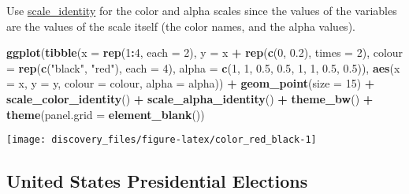 \documentclass[]{book}
\newenvironment{Shaded}{\begin{snugshade}}{\end{snugshade}}
\newcommand{\KeywordTok}[1]{\textcolor[rgb]{0.13,0.29,0.53}{\textbf{#1}}}
\newcommand{\DataTypeTok}[1]{\textcolor[rgb]{0.13,0.29,0.53}{#1}}
\newcommand{\DecValTok}[1]{\textcolor[rgb]{0.00,0.00,0.81}{#1}}
\newcommand{\FloatTok}[1]{\textcolor[rgb]{0.00,0.00,0.81}{#1}}
\newcommand{\StringTok}[1]{\textcolor[rgb]{0.31,0.60,0.02}{#1}}
\newcommand{\OperatorTok}[1]{\textcolor[rgb]{0.81,0.36,0.00}{\textbf{#1}}}
\newcommand{\NormalTok}[1]{#1}
\theoremstyle{definition}
\theoremstyle{definition}
\theoremstyle{definition}
\theoremstyle{remark}
\begin{document}
Use
\href{http://docs.ggplot2.org/current/scale_identity.html}{scale\_identity}
for the color and alpha scales since the values of the variables are the
values of the scale itself (the color names, and the alpha values).

\begin{Shaded}
\begin{Highlighting}[]
\KeywordTok{ggplot}\NormalTok{(}\KeywordTok{tibble}\NormalTok{(}\DataTypeTok{x =} \KeywordTok{rep}\NormalTok{(}\DecValTok{1}\OperatorTok{:}\DecValTok{4}\NormalTok{, }\DataTypeTok{each =} \DecValTok{2}\NormalTok{),}
              \DataTypeTok{y =}\NormalTok{ x }\OperatorTok{+}\StringTok{ }\KeywordTok{rep}\NormalTok{(}\KeywordTok{c}\NormalTok{(}\DecValTok{0}\NormalTok{, }\FloatTok{0.2}\NormalTok{), }\DataTypeTok{times =} \DecValTok{2}\NormalTok{),}
              \DataTypeTok{colour =} \KeywordTok{rep}\NormalTok{(}\KeywordTok{c}\NormalTok{(}\StringTok{"black"}\NormalTok{, }\StringTok{"red"}\NormalTok{), }\DataTypeTok{each =} \DecValTok{4}\NormalTok{),}
              \DataTypeTok{alpha =} \KeywordTok{c}\NormalTok{(}\DecValTok{1}\NormalTok{, }\DecValTok{1}\NormalTok{, }\FloatTok{0.5}\NormalTok{, }\FloatTok{0.5}\NormalTok{, }\DecValTok{1}\NormalTok{, }\DecValTok{1}\NormalTok{, }\FloatTok{0.5}\NormalTok{, }\FloatTok{0.5}\NormalTok{)),}
  \KeywordTok{aes}\NormalTok{(}\DataTypeTok{x =}\NormalTok{ x, }\DataTypeTok{y =}\NormalTok{ y, }\DataTypeTok{colour =}\NormalTok{ colour, }\DataTypeTok{alpha =}\NormalTok{ alpha)) }\OperatorTok{+}
\StringTok{  }\KeywordTok{geom_point}\NormalTok{(}\DataTypeTok{size =} \DecValTok{15}\NormalTok{) }\OperatorTok{+}
\StringTok{  }\KeywordTok{scale_color_identity}\NormalTok{() }\OperatorTok{+}
\StringTok{  }\KeywordTok{scale_alpha_identity}\NormalTok{() }\OperatorTok{+}
\StringTok{  }\KeywordTok{theme_bw}\NormalTok{() }\OperatorTok{+}
\StringTok{  }\KeywordTok{theme}\NormalTok{(}\DataTypeTok{panel.grid =} \KeywordTok{element_blank}\NormalTok{())}
\end{Highlighting}
\end{Shaded}

\begin{center}\texttt{[image: discovery\_files/figure-latex/color\_red\_black-1]} \end{center}

\subsection{United States Presidential
Elections}\label{united-states-presidential-elections}
\end{document}
